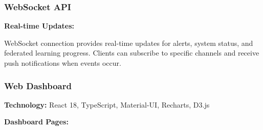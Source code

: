 \documentclass[12pt,a4paper]{article}
\begin{document}
\subsubsection{WebSocket API}

\textbf{Real-time Updates:}

WebSocket connection provides real-time updates for alerts, system status, and federated learning progress. Clients can subscribe to specific channels and receive push notifications when events occur.

\subsubsection{Web Dashboard}

\textbf{Technology:} React 18, TypeScript, Material-UI, Recharts, D3.js

\textbf{Dashboard Pages:}
\end{document}
